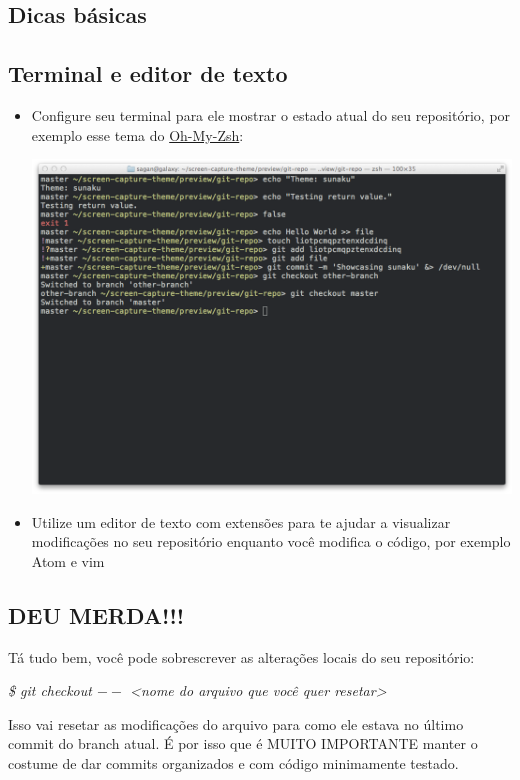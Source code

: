\documentclass[12pt]{article}
\begin{document}
\begin{doublespacing}
\section{Dicas básicas}
\subsection{Terminal e editor de texto}
\begin{itemize}
\item Configure seu terminal para ele mostrar o estado atual do seu repositório, por exemplo esse tema do \href{https://github.com/robbyrussell/oh-my-zsh/}{Oh-My-Zsh}:
\begin{center}
\includegraphics[scale=0.4]{sunaku.png}

\end{center}
\item Utilize um editor de texto com extensões para te ajudar a visualizar modificações no seu repositório enquanto você modifica o código, por exemplo Atom e vim

\end{itemize}

\subsection{DEU MERDA!!!} 

Tá tudo bem, você pode sobrescrever as alterações locais do seu repositório:
\begin{flushleft}
		\textit{\$ git checkout $--$ <nome do arquivo que você quer resetar>}
\end{flushleft}
Isso vai resetar as modificações do arquivo para como ele estava no último commit do branch atual. É por isso que é MUITO IMPORTANTE manter o costume de dar commits organizados e com código minimamente testado.
 

\end{doublespacing}
\end{document}
